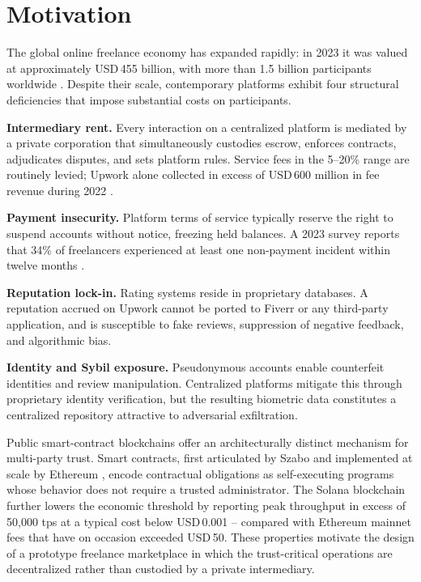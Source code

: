 \section{Motivation}
\label{section:1.1}

The global online freelance economy has expanded rapidly: in 2023 it was valued at approximately USD\,455 billion, with more than 1.5 billion participants worldwide \cite{statista2024freelance}. Despite their scale, contemporary platforms exhibit four structural deficiencies that impose substantial costs on participants.

\textbf{Intermediary rent.} Every interaction on a centralized platform is mediated by a private corporation that simultaneously custodies escrow, enforces contracts, adjudicates disputes, and sets platform rules. Service fees in the 5--20\% range are routinely levied; Upwork alone collected in excess of USD\,600 million in fee revenue during 2022 \cite{upwork2023}.

\textbf{Payment insecurity.} Platform terms of service typically reserve the right to suspend accounts without notice, freezing held balances. A 2023 survey reports that 34\% of freelancers experienced at least one non-payment incident within twelve months \cite{payoneer2023freelancer}.

\textbf{Reputation lock-in.} Rating systems reside in proprietary databases. A reputation accrued on Upwork cannot be ported to Fiverr or any third-party application, and is susceptible to fake reviews, suppression of negative feedback, and algorithmic bias.

\textbf{Identity and Sybil exposure.} Pseudonymous accounts enable counterfeit identities and review manipulation. Centralized platforms mitigate this through proprietary identity verification, but the resulting biometric data constitutes a centralized repository attractive to adversarial exfiltration.

Public smart-contract blockchains offer an architecturally distinct mechanism for multi-party trust. Smart contracts, first articulated by Szabo \cite{szabo1994smart} and implemented at scale by Ethereum \cite{buterin2014ethereum}, encode contractual obligations as self-executing programs whose behavior does not require a trusted administrator. The Solana blockchain \cite{yakovenko2018solana} further lowers the economic threshold by reporting peak throughput in excess of 50{,}000 \gls{tps} at a typical cost below USD\,0.001 -- compared with Ethereum mainnet fees that have on occasion exceeded USD\,50. These properties motivate the design of a prototype freelance marketplace in which the trust-critical operations are decentralized rather than custodied by a private intermediary.

